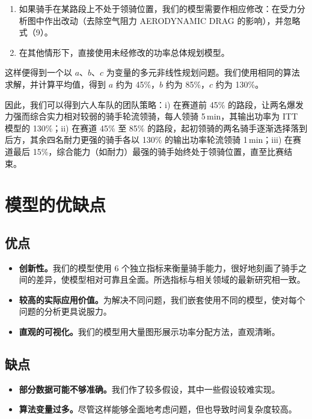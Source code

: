 \documentclass[11pt,a4paper]{ctexart}
\begin{document}
\begin{enumerate}
\item[i)] 如果骑手在某路段上不处于领骑位置，我们的模型需要作相应修改：在受力分析图中作出改动（去除空气阻力 AERODYNAMIC DRAG 的影响），并忽略式（9）。
\item[ii)] 在其他情形下，直接使用未经修改的功率总体规划模型。
\end{enumerate}

这样便得到一个以 $a$、$b$、$c$ 为变量的多元非线性规划问题。我们使用相同的算法求解，并计算平均值，得到 $a$ 约为 45\%，$b$ 约为 85\%，$c$ 约为 130\%。

因此，我们可以得到六人车队的团队策略：i) 在赛道前 45\% 的路段，让两名爆发力强而综合实力相对较弱的骑手轮流领骑，每人领骑 5\,min，其输出功率为 ITT 模型的 130\%；ii) 在赛道 45\% 至 85\% 的路段，起初领骑的两名骑手逐渐选择落到后方，其余四名耐力更强的骑手各以 130\% 的输出功率轮流领骑 1\,min；iii) 在赛道最后 15\%，综合能力（如耐力）最强的骑手始终处于领骑位置，直至比赛结束。

\section{模型的优缺点}

\subsection{优点}

\begin{itemize}
\item \textbf{创新性。}我们的模型使用 6 个独立指标来衡量骑手能力，很好地刻画了骑手之间的差异，使模型相对可靠且全面。所选指标与相关领域的最新研究相一致。
\item \textbf{较高的实际应用价值。}为解决不同问题，我们嵌套使用不同的模型，使对每个问题的分析更具说服力。
\item \textbf{直观的可视化。}我们的模型用大量图形展示功率分配方法，直观清晰。
\end{itemize}

\subsection{缺点}

\begin{itemize}
\item \textbf{部分数据可能不够准确。}我们作了较多假设，其中一些假设较难实现。
\item \textbf{算法变量过多。}尽管这样能够全面地考虑问题，但也导致时间复杂度较高。
\end{itemize}
\end{document}
